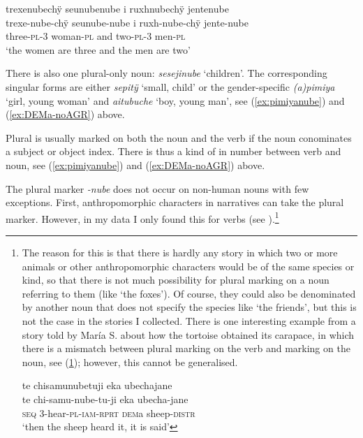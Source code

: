 \ea\label{ex:Plurili-1}
\begingl
\glpreamble trexenubechÿ seunubenube i ruxhnubechÿ jentenube\\
\gla trexe-nube-chÿ seunube-nube i ruxh-nube-chÿ jente-nube\\
\glb three-\textsc{pl}-3 woman-\textsc{pl} and two-\textsc{pl}-3 men-\textsc{pl}\\
\glft ‘the women are three and the men are two’
\endgl
\trailingcitation{[jxx-p120515l-2.239]}
\xe
{}

There is also one plural-only noun: \textit{sesejinube} ‘children’. The corresponding singular forms are either \textit{sepitÿ} ‘small, child’ or the gender-specific \textit{(a)pimiya} ‘girl, young woman’ and \textit{aitubuche} ‘boy, young man’, see (\ref{ex:pimiyanube}) and (\ref{ex:DEMa-noAGR}) above.

Plural is usually marked on both the noun and the verb if the noun conominates a subject or object index. There is thus a kind of  in number between verb and noun, see (\ref{ex:pimiyanube}) and (\ref{ex:DEMa-noAGR}) above.

The plural marker \textit{-nube} does not occur on non-human nouns with few exceptions. First, anthropomorphic characters in narratives can take the plural marker. However, in my data I only found this for verbs (see ).\footnote{The reason for this is that there is hardly any story in which two or more animals or other anthropomorphic characters would be of the same species or kind, so that there is not much possibility for plural marking on a noun referring to them (like ‘the foxes’). Of course, they could also be denominated by another noun that does not specify the species like ‘the friends’, but this is not the case in the stories I collected. There is one interesting example from a story told by María S. about how the tortoise obtained its carapace, in which there is a mismatch between plural marking on the verb and  marking on the noun, see (\ref{ex:mismatch}); however, this cannot be generalised.

\ea\label{ex:mismatch}
\begingl
\glpreamble te chisamunubetuji eka ubechajane\\
\gla te chi-samu-nube-tu-ji eka ubecha-jane\\
\glb \textsc{seq} 3-hear-\textsc{pl}-\textsc{iam}-\textsc{rprt} \textsc{dem}a sheep-\textsc{distr}\\
\glft ‘then the sheep heard it, it is said’
\endgl
\trailingcitation{[rxx-n121128s.10]}
\xe}

